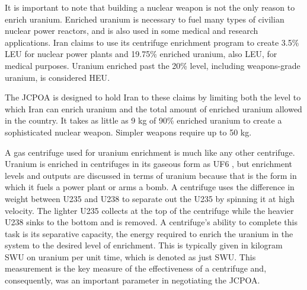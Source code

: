 It is important to note that building a nuclear weapon is not the only reason to enrich uranium. Enriched uranium is necessary to fuel many types of civilian nuclear power reactors, and is also used in some medical and research applications. Iran claims to use its centrifuge enrichment program to create 3.5\% \gls{LEU} for nuclear power plants and 19.75\% enriched uranium, also \gls{LEU}, for medical purposes. Uranium enriched past the 20\% level, including weapons-grade uranium, is considered \gls{HEU}.

The \gls{JCPOA} is designed to hold Iran to these claims by limiting both the level to which Iran can enrich uranium and the total amount of enriched uranium allowed in the country. It takes as little as 9 kg of 90\% enriched uranium to create a sophisticated nuclear weapon. Simpler weapons require up to 50 kg\cite{ucs_2009}. %

A gas centrifuge used for uranium enrichment is much like any other centrifuge. Uranium is enriched in centrifuges in its gaseous form as \gls{UF6} , but enrichment levels and outputs are discussed in terms of uranium because that is the form in which it fuels a power plant or arms a bomb.  A centrifuge uses the difference in weight between \gls{U235} and \gls{U238} to separate out the \gls{U235} by spinning it at high velocity. The lighter \gls{U235} collects at the top of the centrifuge while the heavier \gls{U238} sinks to the bottom and is removed. A centrifuge’s ability to complete this task is its separative capacity, the energy required to enrich the uranium in the system to the desired level of enrichment. This is typically given in kilogram \gls{SWU} on uranium per unit time, which is denoted as just SWU. This measurement is the key measure of the effectiveness of a centrifuge and, consequently, was an important parameter in negotiating the \gls{JCPOA}.  


